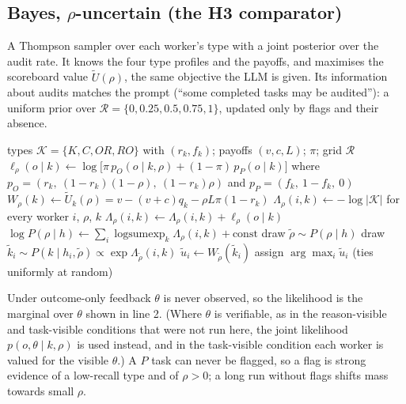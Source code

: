 \documentclass[11pt,letterpaper]{article}
\newcommand{\Ut}{\tilde U}
\numberwithin{equation}{section}
\numberwithin{table}{section}
\numberwithin{figure}{section}
\numberwithin{algorithm}{section}
\begin{document}
\subsection{Bayes, $\rho$-uncertain (the H3 comparator)}

A Thompson sampler over each worker's type with a joint posterior over the audit rate. It knows the four type profiles and the payoffs, and maximises the scoreboard value $\Ut(\rho)$, the same objective the LLM is given. Its information about audits matches the prompt (``some completed tasks may be audited''): a uniform prior over $\mathcal R=\{0,0.25,0.5,0.75,1\}$, updated only by flags and their absence.

\begin{algorithm}[H]
\caption{Bayes, $\rho$-uncertain}
\label{alg:bayes}
\begin{algorithmic}[1]
\Require types $\mathcal K=\{K,C,OR,RO\}$ with $(r_k,f_k)$; payoffs $(v,c,L)$; $\pi$; grid $\mathcal R$
  \State $\ell_\rho(o\mid k)\gets\log\bigl[\pi\,p_O(o\mid k,\rho)+(1-\pi)\,p_P(o\mid k)\bigr]$
  \Statex \hspace{\algorithmicindent}where $p_O=(r_k,\ (1-r_k)(1-\rho),\ (1-r_k)\rho)$ and $p_P=(f_k,\ 1-f_k,\ 0)$
  \State $W_\rho(k)\gets\Ut_k(\rho)=v-(v+c)q_k-\rho L\pi(1-r_k)$
\EndFor
\State $\Lambda_\rho(i,k)\gets-\log|\mathcal K|$ for every worker $i$, $\rho$, $k$ 
    \State $\Lambda_\rho(i,k)\gets\Lambda_\rho(i,k)+\ell_\rho(o\mid k)$
  \EndFor
  \State $\log P(\rho\mid h)\gets\sum_i\operatorname{logsumexp}_k\Lambda_\rho(i,k)+\text{const}$ 
  \State draw $\tilde\rho\sim P(\rho\mid h)$
    \State draw $\tilde k_i\sim P(k\mid h_i,\tilde\rho)\propto\exp\Lambda_{\tilde\rho}(i,k)$
    \State $\tilde u_i\gets W_{\tilde\rho}(\tilde k_i)$
  \EndFor
  \State assign $\arg\max_i\tilde u_i$ (ties uniformly at random)
\EndFor
\end{algorithmic}
\end{algorithm}

\noindent Under outcome-only feedback $\theta$ is never observed, so the likelihood is the marginal over $\theta$ shown in line 2. (Where $\theta$ is verifiable, as in the reason-visible and task-visible conditions that were not run here, the joint likelihood $p(o,\theta\mid k,\rho)$ is used instead, and in the task-visible condition each worker is valued for the visible $\theta$.) A $P$ task can never be flagged, so a flag is strong evidence of a low-recall type and of $\rho>0$; a long run without flags shifts mass towards small $\rho$.
\end{document}
